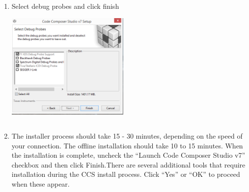 \documentclass[17pt]{article}
\begin{document}
{\begin{enumerate}
					\item Select debug probes and click finish \\
							{\centering
							\includegraphics[width=6cm, height=6cm]{CCSInstall4}}
					\item The installer process	should take 15 - 30 minutes, depending on the speed of your connection. The offline
					installation should take 10 to 15 minutes. When the installation is complete, uncheck the
					“Launch Code Composer Studio v7” checkbox and then click Finish.There are several additional tools that require installation during the CCS install process. Click “Yes” or “OK” to proceed when these appear. \\
				\end{enumerate}}
				
\end{document}

